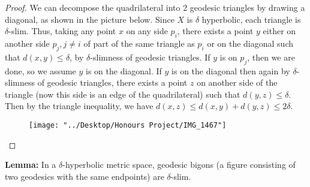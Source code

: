 \documentclass[12pt]{article}
\begin{document}
	\begin{proof}
		
		We can decompose the quadrilateral into 2 geodesic triangles by drawing a diagonal, as shown in the picture below. Since $X$ is $\delta$ hyperbolic, each triangle is $\delta$-slim. Thus, taking any point $x$ on any side $p_i$, there exists a point $y$ either on another side $p_j, j \neq i$ of part of the same triangle as $p_i$ or on the diagonal such that $d(x,y) \leq \delta$, by $\delta$-slimness of geodesic triangles. If $y$ is on $p_j$, then we are done, so we assume $y$ is on the diagonal. If $y$ is on the diagonal then again by $\delta$-slimness of geodesic triangles, there exists a point $z$ on another side of the triangle (now this side is an edge of the quadrilateral) such that $d(y,z) \leq \delta$. Then by the triangle inequality, we have $d(x,z) \leq d(x,y) + d(y,z) \leq 2\delta$.
		
		\begin{figure} [h]
			\centering
			\texttt{[image: "../Desktop/Honours Project/IMG\_1467"]}
			\caption{}
			\label{fig:img1467}
		\end{figure}
		
	\end{proof}
	
	\textbf{Lemma: } In a $\delta$-hyperbolic metric space, geodesic bigons (a figure consisting of two geodesics with the same endpoints) are $\delta$-slim. 
	
\end{document}
